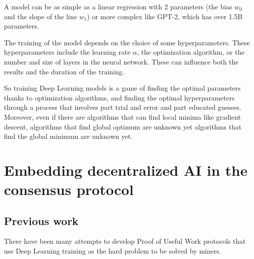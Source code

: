 \documentclass[conference]{IEEEtran}
\begin{document}
A model can be as simple as a linear regression with 2 parameters (the bias $w_0$ and the slope of the line $w_1$) or more complex like GPT-2, which has over 1.5B parameters\cite{b5}.

The training of the model depends on the choice of some hyperparameters. These hyperparameters include the learning rate $\alpha$, the optimization algorithm, or the number and size of layers in the neural network. These can influence both the results and the duration of the training.

So training Deep Learning models is a game of finding the optimal parameters thanks to optimization algorithms, and finding the optimal hyperparameters through a process that involves part trial and error and part educated guesses. Moreover, even if there are algorithms that can find local minima like gradient descent, algorithms that find global optimum are unknown yet algorithms that find the global minimum are unknown yet.

\section{Embedding decentralized AI in the consensus protocol}
\subsection{Previous work}
There have been many attempts to develop Proof of Useful Work protocols that use Deep Learning training as the hard problem to be solved by miners.
\end{document}
